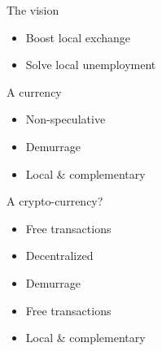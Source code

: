 \documentclass{beamer}
\begin{document}
  \begin{frame}{The vision}
    \begin{itemize}
      \item Boost \alert{local} exchange
      \item Solve \alert{local} unemployment
    \end{itemize}
  \end{frame}

  \begin{frame}{A currency}
    \begin{itemize}
      \item Non-speculative
      \item Demurrage
      \item Local \& complementary
    \end{itemize}
  \end{frame}

  \begin{frame}{A crypto-currency?}
    \begin{itemize}
      \item Free transactions
      \item Decentralized
      \item Demurrage
      \item Free transactions
      \item Local \& complementary
    \end{itemize}
  \end{frame}
\end{document}
